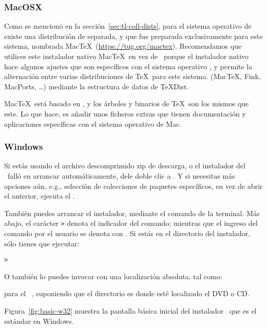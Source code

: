 \documentclass{article}
\begin{document}
\subsubsection{MacOSX}
\label{sec:macosx}

Como se mencionó en la sección~\ref{sec:tl-coll-dists}, para el
sistema operativo de \MacOSX existe una distribución de \TL{} separada, 
y que fue preparada exclusivamente para este sistema, nombrada
Mac\TeX\ (\url{https://tug.org/mactex}).  Recomendamos que utilices
este instalador nativo Mac\TeX\ en vez de \TL\, porque el instalador
nativo hace algunos ajustes que son específicos con el sistema
operativo \MacOSX, y permite la alternación entre varias
distribuciones de \TeX\ para este sistema. (Mac\TeX, Fink, MacPorts,
\ldots) mediante la estructura de datos de \TeX{}Dist.

Mac\TeX\ está basado en \TL, y los árboles y binarios de \TeX\ son los mismos que
este. Lo que hace, es añadir unos ficheros extras que tienen documentación y
aplicaciones específicas con el sistema operativo de Mac.

\subsubsection{Windows}\label{sec:wininst}

Si estás usando el archivo descomprimido zip de descarga, o el
instalador del \DVD\ falló en arrancar automáticamente, dele doble
clic a . Y si necesitas más opciones
aún, e.g., selección de colecciones de paquetes específicos, en vez de
abrir el anterior, ejecuta el . 

También puedes arrancar el instalador, mediante el comando de la
terminal. Más abajo, el carácter \texttt{>} denota el indicador del comando;
mientras que el ingreso del comando por el usuario se denota con
. Si estás en el directorio del instalador, sólo
tienes que ejecutar:
\begin{alltt}
	> 
\end{alltt}

O también lo puedes invocar con una localización absoluta, tal como:
\begin{alltt}
\end{alltt}
para el \TK\ \DVD, suponiendo que el directorio  es donde
esté localizado el \textsc{DVD} o \textsc{CD}.

Figura~\ref{fig:basic-w32} muestra la pantalla básica
inicial del instalador \GUI\ que es el estándar en
Windows.\\
\end{document}
